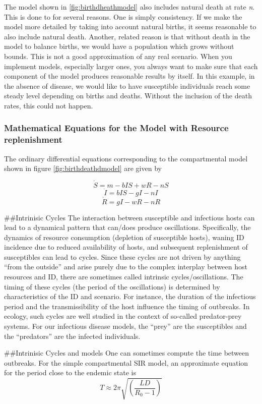 \documentclass[]{book}
\theoremstyle{definition}
\theoremstyle{definition}
\theoremstyle{definition}
\theoremstyle{remark}
\begin{document}
The model shown in \ref{fig:birthdheathmodel} also includes natural
death at rate \emph{n}. This is done to for several reasons. One is
simply consistency. If we make the model more detailed by taking into
account natural births, it seems reasonable to also include natural
death. Another, related reason is that without death in the model to
balance births, we would have a population which grows without bounds.
This is not a good approximation of any real scenario. When you
implement models, especially larger ones, you always want to make sure
that each component of the model produces reasonable results by itself.
In this example, in the absence of disease, we would like to have
susceptible individuals reach some steady level depending on births and
deaths. Without the inclusion of the death rates, this could not happen.

\hypertarget{myadvancedbox}{%
\subsubsection{Mathematical Equations for the Model with Resource
replenishment}\label{myadvancedbox}}

The ordinary differential equations corresponding to the compartmental
model shown in figure \ref{fig:birthdeathdmodel} are given by

\[\dot S = m - b I S + wR - n S \] \[\dot I = b IS - gI - n I \]
\[\dot R =  gI - wR - n R\]

\#\#Intrinisic Cycles The interaction between susceptible and infectious
hosts can lead to a dynamical pattern that can/does produce
oscillations. Specifically, the dynamics of resource consumption
(depletion of susceptible hosts), waning ID incidence due to reduced
availability of hosts, and subsequent replenishment of susceptibles can
lead to cycles. Since these cycles are not driven by anything ``from the
outside'' and arise purely due to the complex interplay between host
resources and ID, there are sometimes called intrinsic
cycles/oscillations. The timing of these cycles (the period of the
oscillations) is determined by characteristics of the ID and scenario.
For instance, the duration of the infectious period and the
transmissibility of the host influence the timing of outbreaks. In
ecology, such cycles are well studied in the context of so-called
predator-prey systems. For our infectious disease models, the ``prey''
are the susceptibles and the ``predators'' are the infected individuals.

\#\#Intrinisic Cycles and models One can sometimes compute the time
between outbreaks. For the simple compartmental SIR model, an
approximate equation for the period close to the endemic state is
\[T \approx 2 \pi \sqrt{\left( \frac{LD}{R_0 - 1} \right)}\]
\end{document}
